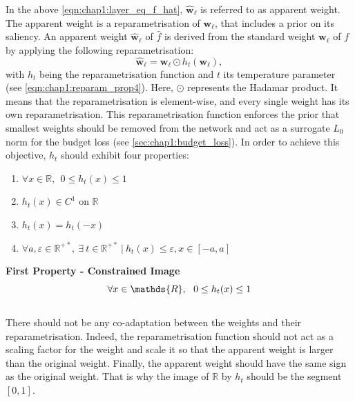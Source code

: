 \noindent In the above \cref{eqn:chap1:layer_eq_f_hat}, $\mathbf{\hat w}_\ell$
is referred to as apparent weight. The apparent weight is a reparametrisation of
$\mathbf{w}_\ell$, that includes a prior on its saliency. An apparent weight
$\mathbf{\hat w}_\ell$ of $\hat{f}$ is derived from the standard weight
$\mathbf{w}_\ell$ of $f$ by applying the following reparametrisation: 
\begin{equation}
  \label{eqn:reparam}
  \mathbf{\hat w}_\ell = \mathbf{w}_\ell  \odot h_t(\mathbf{w}_\ell),
\end{equation}
\noindent with $h_t$ being the reparametrisation function and $t$ its
temperature parameter (see \cref{eqn:chap1:reparam_prop4}). Here, $\odot$ represents the Hadamar product. It means
that the reparametrisation is element-wise, and every single weight has its own
reparametrisation. This reparametrisation function enforces the prior that
smallest weights should be removed from the network and act as a surrogate $L_0$
norm for the budget loss (see \cref{sec:chap1:budget_loss}). In order to achieve
this objective, $h_t$ should exhibit four properties: \\

\begin{enumerate}
  \item $\forall x \in \mathds{R},~~ 0 \leq h_t(x) \leq 1 $
  \item $h_t(x) \in C^1 \text{ on } \mathds{R}$
  \item $h_t(x) = h_t(-x)$
  \item $\forall a,\varepsilon \in\mathds{R}^{+\ast},~ \exists ~t
  \in\mathds{R}^{+\ast} ~ | ~ h_t(x) \leq \varepsilon, x \in [-a,a]$
\end{enumerate}

\noindent\textbf{First Property - Constrained Image} \\
\begin{equation}
    \centering
    \forall x \in \mathds{R},~~ 0 \leq h_t(x) \leq 1
    \label{eqn:chap1:reparam_prop1}
\end{equation}
\\
There should not be any co-adaptation between the weights and their
reparametrisation. Indeed, the reparametrisation function should not act as a
scaling factor for the weight and scale it so that the apparent weight is larger
than the original weight. Finally, the apparent weight should have the same sign
as the original weight. That is why the image of $\mathbb{R}$ by $h_t$ should be
the segment $[0,1]$.\\

